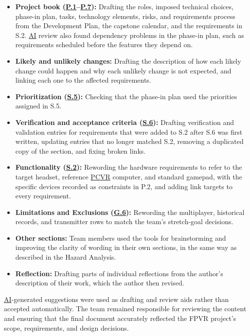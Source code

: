 \documentclass[12pt]{article}
\begin{document}
\begin{enumerate}
    \begin{itemize}
        \item \textbf{Project book (\hyperref[p1]{P.1}--\hyperref[p7]{P.7}):}
        Drafting the roles, imposed technical choices, phase-in plan, tasks,
        technology elements, risks, and requirements process from the
        Development Plan, the capstone calendar, and the requirements in S.2.
        \hyperlink{glos:AI}{AI} review also found dependency problems in the phase-in plan, such as
        requirements scheduled before the features they depend on.
        \item \textbf{Likely and unlikely changes:} Drafting the description of
        how each likely change could happen and why each unlikely change is not
        expected, and linking each one to the affected requirements.
        \item \textbf{Prioritization (\hyperref[s5]{S.5}):} Checking that the
        phase-in plan used the priorities assigned in S.5.
        \item \textbf{Verification and acceptance criteria
        (\hyperref[s6]{S.6}):} Drafting verification and validation entries for
        requirements that were added to S.2 after S.6 was first written,
        updating entries that no longer matched S.2, removing a duplicated copy
        of the section, and fixing broken links.
        \item \textbf{Functionality (\hyperref[s2]{S.2}):} Rewording the
        hardware requirements to refer to the target headset, reference \hyperlink{glos:PCVR}{PCVR}
        computer, and standard gamepad, with the specific devices recorded as
        constraints in P.2, and adding link targets to every requirement.
        \item \textbf{Limitations and Exclusions (\hyperref[g6]{G.6}):}
        Rewording the multiplayer, historical records, and transmitter rows to
        match the team's stretch-goal decisions.
        \item \textbf{Other sections:} Team members used the tools for
        brainstorming and improving the clarity of wording in their own
        sections, in the same way as described in the Hazard Analysis.
        \item \textbf{Reflection:} Drafting parts of individual reflections
        from the author's description of their work, which the author then
        revised.
    \end{itemize}

    \hyperlink{glos:AI}{AI}-generated suggestions were used as drafting and review aids rather
    than accepted automatically. The team remained responsible for reviewing
    the content and ensuring that the final document accurately reflected the
    FPVR project's scope, requirements, and design decisions.
\end{enumerate}
\end{document}
